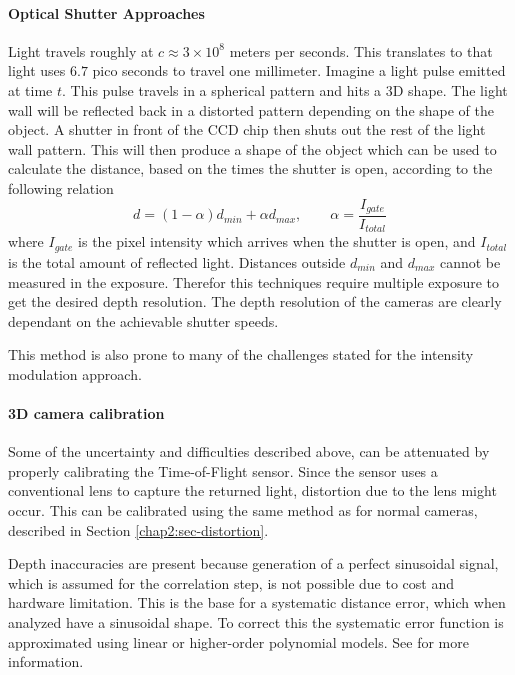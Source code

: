\paragraph{Optical Shutter Approaches}
Light travels roughly at $c \approx 3 \times 10^8$ meters per seconds. This translates to
that light uses $6.7$ pico seconds to travel one millimeter. Imagine a light pulse emitted
at time $t$. This pulse travels in a spherical pattern and hits a 3D shape. The light wall
will be reflected back in a distorted pattern depending on the shape of the object.\cite{optical-shutter} 
A shutter in front of the CCD chip then
shuts out the rest of the light wall pattern. This will then produce a shape of the object
which can be used to calculate the distance, based on the times the shutter is open,
according to the following relation \cite{time-of-flight-comp-graphics}
\begin{equation}
    d = (1 - \alpha) d_{min} + \alpha d_{max}, \quad \quad \alpha =
    \frac{I_{gate}}{I_{total}}
\end{equation}
where $I_{gate}$ is the pixel intensity which arrives when the shutter is open, and
$I_{total}$ is the total amount of reflected light. Distances outside $d_{min}$ and
$d_{max}$ cannot be measured in the exposure. Therefor this techniques require multiple
exposure to get the desired depth resolution. The depth resolution of the cameras are
clearly dependant on the achievable shutter speeds. 

This method is also prone to many of the challenges stated for the intensity modulation
approach.

\paragraph{3D camera calibration}
Some of the uncertainty and difficulties described above, can be attenuated by properly
calibrating the Time-of-Flight sensor. Since the sensor uses a conventional lens to
capture the returned light, distortion due to the lens might occur. This can be calibrated
using the same method as for normal cameras, described in Section
\ref{chap2:sec-distortion}. 

Depth inaccuracies are present because generation of a perfect sinusoidal signal, which is
assumed for the correlation step, is not possible due to cost and hardware limitation. This
is the base for a systematic distance error, which when analyzed have a sinusoidal shape.
 To correct this the systematic error function is approximated
using linear or higher-order polynomial models.  See \cite{tof-calibration} for more
information.


